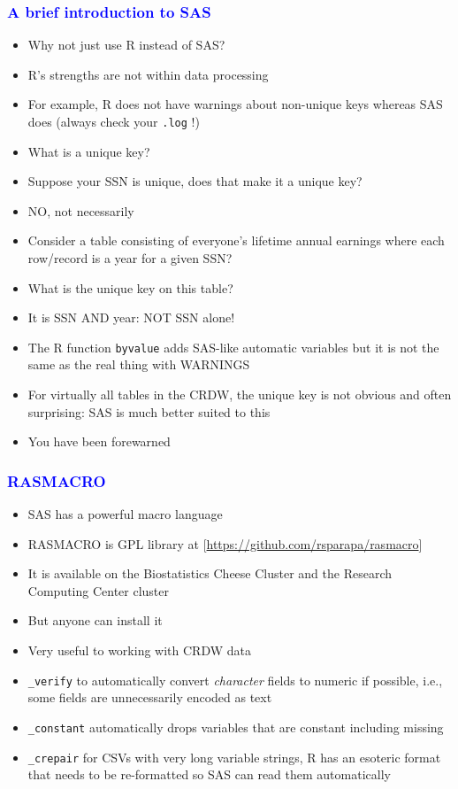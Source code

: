 \documentclass[11pt,pdftex,dvipsnames,usenames]{beamer}
\begin{document}
\begin{frame}[fragile]\frametitle{\bf\textcolor{blue}{A brief
introduction to SAS}}

\begin{itemize}
\item Why not just use R instead of SAS?
\item R's strengths are not within data processing
\item For example, R does not have warnings about non-unique keys
whereas SAS does (always check your \texttt{.log} !)
\item What is a unique key?
\item Suppose your SSN is unique, does that make it a unique key?
\item NO, not necessarily
\item Consider a table consisting of everyone's lifetime annual
  earnings where each row/record is a year for a given SSN?
\item What is the unique key on this table?
\item It is SSN AND year: NOT SSN alone!
\item The R function \texttt{byvalue} adds SAS-like
automatic variables but it is not the same as the real
thing with WARNINGS
\item For virtually all tables in the CRDW, the unique key
is not obvious and often surprising: SAS is much better suited to this
\item You have been forewarned
\end{itemize}

\end{frame}


\begin{frame}[fragile]\frametitle{\bf\textcolor{blue}{RASMACRO}}
\begin{itemize}
\item SAS has a powerful macro language
\item RASMACRO is GPL library at 
\textcolor{PineGreen}{[\href{https://github.com/rsparapa/rasmacro}{https://github.com/rsparapa/rasmacro}]}
\item It is available on the Biostatistics Cheese Cluster
and the Research Computing Center cluster
\item But anyone can install it
\item Very useful to working with CRDW data 
\item \texttt{\_verify} to automatically convert {\it character} fields to numeric if possible,
i.e., some fields are unnecessarily encoded as text
\item \texttt{\_constant} automatically drops variables that are constant including missing
\item \texttt{\_crepair} for CSVs with very long variable strings, R has an esoteric format
that needs to be re-formatted so SAS can read them automatically
\end{itemize}
\end{frame}
\end{document}
